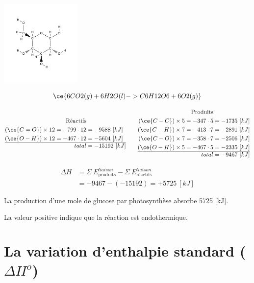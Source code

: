 \documentclass[
  11pt,
  a4paper,
  openany]{book}
\begin{document}
\begin{Answer}
\includegraphics[width=0.3\textwidth,height=\textheight]{images/glucose.png}

\[
\ce{6 CO2(g) + 6 H2O(l) -> C6H12O6 + 6 O2(g)}
\]

\[
\begin{split}
  \text{Réactifs}& \\
  (\ce{C=O}) \times 12 = -799 \cdot 12 &= -9588\ [kJ] \\
  (\ce{O-H}) \times 12 = -467 \cdot 12 &= -5604\ [kJ] \\
  \hline
  total &= -15192\ [kJ]
\end{split}
\qquad
\begin{split}
  \text{Produits}& \\
  (\ce{C-C}) \times 5 = -347 \cdot 5 &= -1735\ [kJ] \\
  (\ce{C-H}) \times 7 = -413 \cdot 7 &= -2891\ [kJ] \\
  (\ce{C-O}) \times 7 = -358 \cdot 7 &= -2506\ [kJ] \\
  (\ce{O-H}) \times 5 = -467 \cdot 5 &= -2335\ [kJ] \\
  \hline
  total &= -9467\ [kJ]
\end{split}
\]

\[
\begin{split}
\Delta H &= \Sigma\ E^{liaison}_{\text{produits}} - \Sigma\ E^{liaison}_{\text{réactifs}} \\
  &= -9467 - (-15192) = +5725\ [kJ]
\end{split}
\]

La production d'une mole de glucose par photosynthèse absorbe 5725 {[}kJ{]}.

La valeur positive indique que la réaction est endothermique.

\end{Answer}

\clearpage

\section{\texorpdfstring{La variation d'enthalpie standard (\(\Delta H^o\))}{La variation d'enthalpie standard (\textbackslash Delta H\^{}o)}}\label{la-variation-denthalpie-standard-delta-ho}
\end{document}
